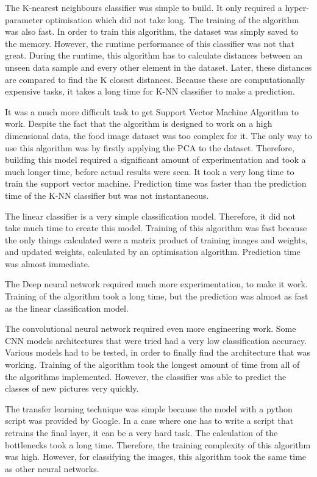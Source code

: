 The K-nearest neighbours classifier was simple to build. It only required a hyper-parameter optimisation which did not take long. The training of the algorithm was also fast. In order  to train this algorithm, the dataset was simply saved to the memory. However, the runtime performance of this classifier was not that great. During the runtime, this algorithm has to calculate  distances between an unseen data sample  and every other element in the dataset. Later, these distances are compared to find the K closest distances. Because these are  computationally expensive tasks, it takes a long time for K-NN classifier to make a prediction.

It was a much more difficult task to get Support Vector Machine Algorithm to work. Despite the fact that the algorithm is designed to work on a high dimensional data,  the food image dataset was too complex for it. The only way to use this algorithm was by firstly applying the PCA to the dataset. Therefore, building this model required a significant amount of experimentation and took a much longer time, before actual results were seen. It took a very long time to train the support vector machine. Prediction time was faster than the prediction time of the K-NN classifier but was not instantaneous.

The linear classifier is a very simple classification model. Therefore, it did not take much time to create this model. Training of this algorithm was fast because the only things calculated were a matrix product of training images and weights, and updated weights, calculated by an optimisation algorithm. Prediction time was almost immediate.

The Deep neural network required much more experimentation, to make it work. Training of the algorithm took a long time, but the prediction was almost as fast as the linear classification model.

The convolutional neural network required even more engineering work. Some CNN models architectures that were tried had a very low classification accuracy. Various models had to be tested, in order to finally find the architecture that was working.  Training of the algorithm took the longest amount of time from all of the algorithms implemented. However, the classifier was able to predict the classes of new pictures very quickly.

The transfer learning technique was simple because the model with a python script was provided by Google. In a case where one has to write a script that retrains the final layer,  it can be a very hard task. The calculation of the bottlenecks took a long time. Therefore, the training complexity of this algorithm was high.  However, for classifying the images, this algorithm took the same time as other neural networks.


